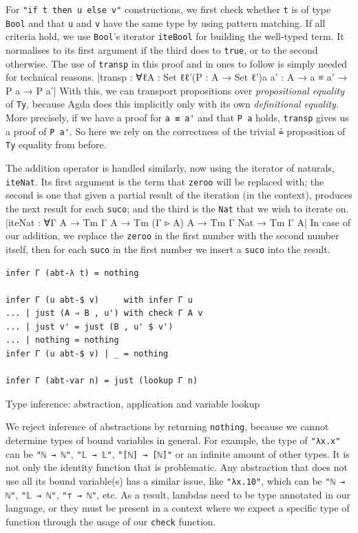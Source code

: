 For \verb$"if t then u else v"$ constructions, we first check whether \verb$t$ is of type \verb$Bool$ and that \verb$u$ and \verb$v$ have the same type by using pattern matching. If all criteria hold, we use \verb$Bool$'s iterator \verb$iteBool$ for building the well-typed term. It normalises to its first argument if the third does to \verb$true$, or to the second otherwise. The use of \verb$transp$ in this proof and in ones to follow is simply needed for technical reasons.
|transp : ∀{ℓ}{A : Set ℓ}{ℓ'}(P : A → Set ℓ'){a a' : A} → a ≡ a' → P a → P a'|
With this, we can transport propositions over \textit{propositional equality} of \verb$Ty$, because Agda does this implicitly only with its own \textit{definitional equality}. More precisely, if we have a proof for \verb$a ≡ a'$ and that \verb$P a$ holds, \verb$transp$ gives us a proof of \verb$P a'$. So here we rely on the correctness of the trivial \verb$≟$ proposition of \verb$Ty$ equality from before.

The addition operator is handled similarly, now using the iterator of naturals, \verb$iteNat$. Its first argument is the term that \verb$zeroo$ will be replaced with; the second is one that given a partial result of the iteration (in the context), produces the next result for each \verb$suco$; and the third is the \verb$Nat$ that we wish to iterate on.
|iteNat : ∀{Γ A} → Tm Γ A → Tm (Γ ▹ A) A → Tm Γ Nat → Tm Γ A|
In case of our addition, we replace the \verb$zeroo$ in the first number with the second number itself, then for each \verb$suco$ in the first number we insert a \verb$suco$ into the result.

\begin{listing}[H]
\begin{verbatim}
infer Γ (abt-λ t) = nothing

infer Γ (u abt-$ v)     with infer Γ u
... | just (A ⇒ B , u') with check Γ A v
... | just v' = just (B , u' $ v')
... | nothing = nothing
infer Γ (u abt-$ v) | _ = nothing

infer Γ (abt-var n) = just (lookup Γ n)
\end{verbatim}
\caption{Type inference: abstraction, application and variable lookup}
\label{code:typecheck-infer-lam}
\end{listing}

We reject inference of abstractions by returning \verb$nothing$, because we cannot determine types of bound variables in general. For example, the type of \verb$"λx.x"$ can be \verb$"ℕ → ℕ"$, \verb$"𝕃 → 𝕃"$, \verb$"[ℕ] → [ℕ]"$ or an infinite amount of other types. It is not only the identity function that is problematic. Any abstraction that does not use all its bound variable(s) has a similar issue, like \verb$"λx.10"$, which can be \verb$"ℕ → ℕ"$, \verb$"𝕃 → ℕ"$, \verb$"⊤ → ℕ"$, etc. As a result, lambdas need to be type annotated in our language, or they must be present in a context where we expect a specific type of function through the usage of our \verb$check$ function.


